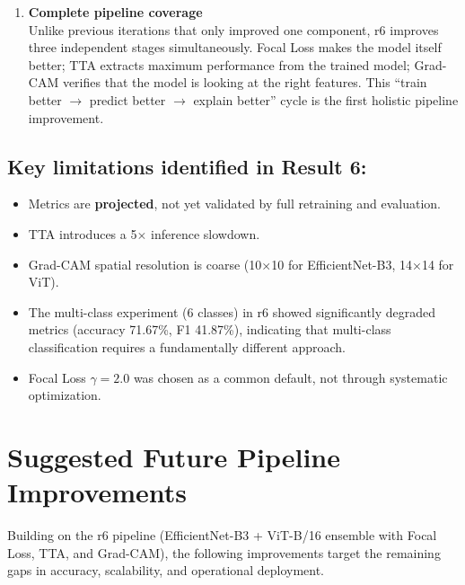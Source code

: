 \documentclass[11pt]{article}
\begin{document}
\begin{enumerate}
    \item \textbf{Complete pipeline coverage}\\
          Unlike previous iterations that only improved one component, r6 improves three independent stages simultaneously. Focal Loss makes the model itself better; TTA extracts maximum performance from the trained model; Grad-CAM verifies that the model is looking at the right features. This ``train better $\to$ predict better $\to$ explain better'' cycle is the first holistic pipeline improvement.
\end{enumerate}

\subsection{Key limitations identified in Result 6:}

\begin{itemize}
    \item Metrics are \textbf{projected}, not yet validated by full retraining and evaluation.
    \item TTA introduces a 5$\times$ inference slowdown.
    \item Grad-CAM spatial resolution is coarse (10$\times$10 for EfficientNet-B3, 14$\times$14 for ViT).
    \item The multi-class experiment (6 classes) in r6 showed significantly degraded metrics (accuracy 71.67\%, F1 41.87\%), indicating that multi-class classification requires a fundamentally different approach.
    \item Focal Loss $\gamma = 2.0$ was chosen as a common default, not through systematic optimization.
\end{itemize}

\section{Suggested Future Pipeline Improvements}

Building on the r6 pipeline (EfficientNet-B3 + ViT-B/16 ensemble with Focal Loss, TTA, and Grad-CAM), the following improvements target the remaining gaps in accuracy, scalability, and operational deployment.
\end{document}
